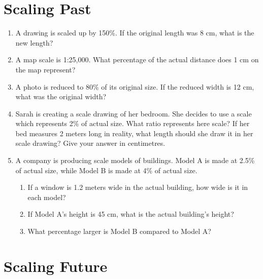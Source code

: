 \documentclass[12pt]{article}
\begin{document}
\newpage{}


\section*{Scaling Past}

\begin{enumerate}[resume]

\item A drawing is scaled up by 150\%. If the original length was 8 cm, what is the new length?

\item A map scale is 1:25,000. What percentage of the actual distance does 1 cm on the map represent?

\item A photo is reduced to 80\% of its original size. If the reduced width is 12 cm, what was the original width?

\item Sarah is creating a scale drawing of her bedroom. She decides to use a scale which represents 2\% of actual size. What ratio represents here scale? If her bed measures 2 meters long in reality, what length should she draw it in her scale drawing? Give your answer in centimetres.

\item A company is producing scale models of buildings. Model A is made at 2.5\% of actual size, while Model B is made at 4\% of actual size. 
\begin{enumerate}
    \item If a window is 1.2 meters wide in the actual building, how wide is it in each model?
    \item If Model A's height is 45 cm, what is the actual building's height?
    \item What percentage larger is Model B compared to Model A?
\end{enumerate}

\end{enumerate}


\section*{Scaling Future}
\end{document}
